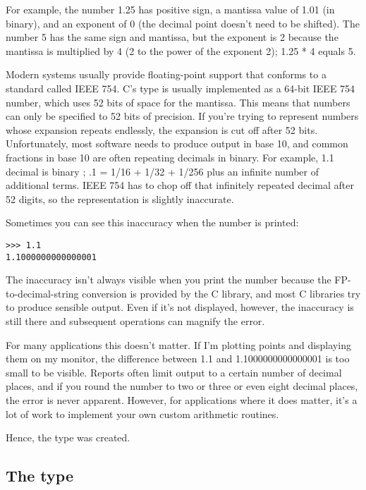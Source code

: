 \documentclass{howto}
\begin{document}
For example, the number 1.25 has positive sign, a mantissa value of
1.01 (in binary), and an exponent of 0 (the decimal point doesn't need
to be shifted).  The number 5 has the same sign and mantissa, but the
exponent is 2 because the mantissa is multiplied by 4 (2 to the power
of the exponent 2); 1.25 * 4 equals 5.

Modern systems usually provide floating-point support that conforms to
a standard called IEEE 754.  C's  type is usually
implemented as a 64-bit IEEE 754 number, which uses 52 bits of space
for the mantissa.  This means that numbers can only be specified to 52
bits of precision.  If you're trying to represent numbers whose
expansion repeats endlessly, the expansion is cut off after 52 bits.
Unfortunately, most software needs to produce output in base 10, and
common fractions in base 10 are often repeating decimals in binary.
For example, 1.1 decimal is binary ; .1 =
1/16 + 1/32 + 1/256 plus an infinite number of additional terms.  IEEE
754 has to chop off that infinitely repeated decimal after 52 digits,
so the representation is slightly inaccurate.

Sometimes you can see this inaccuracy when the number is printed:
\begin{verbatim}
>>> 1.1
1.1000000000000001
\end{verbatim}

The inaccuracy isn't always visible when you print the number because
the FP-to-decimal-string conversion is provided by the C library, and
most C libraries try to produce sensible output.  Even if it's not
displayed, however, the inaccuracy is still there and subsequent
operations can magnify the error.

For many applications this doesn't matter.  If I'm plotting points and
displaying them on my monitor, the difference between 1.1 and
1.1000000000000001 is too small to be visible.  Reports often limit
output to a certain number of decimal places, and if you round the
number to two or three or even eight decimal places, the error is
never apparent.  However, for applications where it does matter, 
it's a lot of work to implement your own custom arithmetic routines.

Hence, the  type was created.

\subsection{The  type}
\end{document}
